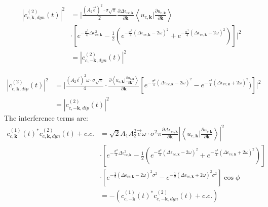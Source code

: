 \begin{equation}
\begin{aligned}
    |c^{(2)}_{c,\mathbf k,dyn}(t)|^2&= \lvert \frac{(A_2 \vec e)^2 \cdot \sigma \sqrt{\pi}}{2}
  \frac{\partial  \Delta \epsilon_{vc,\mathbf k}}{\partial \mathbf k} \left \langle u_{c,\mathbf k}\Big
  |\frac{\partial u_{v,\mathbf k}}{\partial \mathbf k} \right \rangle\\ 
                                  &    \cdot [e^{-\frac{\sigma^2}{4} \Delta \epsilon_{vc,\mathbf k} ^2}-\frac{1}{2}(e^{-\frac{\sigma^2}{4} (\Delta \epsilon_{vc,\mathbf k}-2\omega )^2}+e^{-\frac{\sigma^2}{4} (\Delta \epsilon_{vc,\mathbf k}+2\omega )^2})] \rvert^2\\
    &=|c^{(2)}_{c,-\mathbf k,dyn}(t)|^2
\end{aligned}
\end{equation}

\begin{equation}
\begin{aligned}
  |c^{(2)}_{c,\mathbf k,dip}(t)|^2&= \lvert \frac{(A_2 \vec e)^2 \omega  \cdot \sigma \sqrt{\pi}}{4} \cdot \frac{\partial{\left \langle u_{c,\mathbf k}\Big |\frac{\partial u_{v,\mathbf k}}{\partial \mathbf k} \right \rangle}}{\partial {\mathbf k}}  [e^{-\frac{\sigma^2}{4} (\Delta \epsilon_{vc,\mathbf k}-2\omega )^2}-e^{-\frac{\sigma^2}{4} (\Delta \epsilon_{vc,\mathbf k}+2\omega )^2})] \rvert^2\\
  &=  |c^{(2)}_{c,-\mathbf k,dip}(t)|^2
\end{aligned}
\end{equation}
The interference terms are:
\begin{equation}
\begin{aligned}
    c^{(1)}_{c,\mathbf k}(t)^* c^{(2)}_{c,\mathbf k,dyn}(t) +c.c.&=
   \sqrt{2} A_1 A_2^2 \vec e \omega  \cdot \sigma^2 \pi \frac{\partial  \Delta \epsilon_{vc,\mathbf k}}{\partial \mathbf k} |\left \langle u_{c,\mathbf k}\Big |\frac{\partial u_{v,\mathbf k}}{\partial \mathbf k} \right \rangle|^2 \\
    &\cdot [e^{-\frac{\sigma^2}{4} \Delta \epsilon_{vc,\mathbf k} ^2}-\frac{1}{2}(e^{-\frac{\sigma^2}{4} (\Delta \epsilon_{vc,\mathbf k}-2\omega )^2}+e^{-\frac{\sigma^2}{4} (\Delta \epsilon_{vc,\mathbf k}+2\omega )^2})]\\
    &\cdot[e^{-\frac{1}2{}(\Delta \epsilon_{vc,\mathbf k} - 2\omega )^2 \sigma^2}
    -e^{-\frac{1}{2}(\Delta \epsilon_{vc,\mathbf k} + 2\omega )^2 \sigma^2}
    ]\cos\phi\\
    &= -(c^{(1)}_{c,-\mathbf k}(t)^* c^{(2)}_{c,-\mathbf k,dyn}(t) +c.c.)
\end{aligned}
\end{equation}


